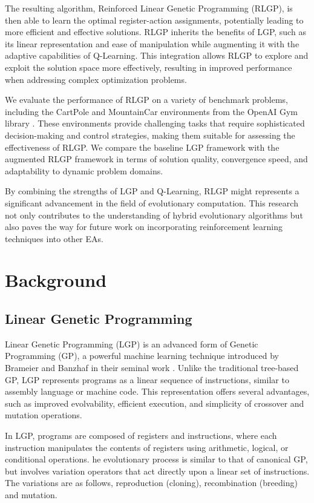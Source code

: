 \documentclass[12pt, final]{dalcsthesis}
\begin{document}
The resulting algorithm, Reinforced Linear Genetic Programming (RLGP), is then able to learn the optimal register-action assignments, potentially leading to more efficient and effective solutions. RLGP inherits the benefits of LGP, such as its linear representation and ease of manipulation while augmenting it with the adaptive capabilities of Q-Learning. This integration allows RLGP to explore and exploit the solution space more effectively, resulting in improved performance when addressing complex optimization problems.

We evaluate the performance of RLGP on a variety of benchmark problems, including the CartPole and MountainCar environments from the OpenAI Gym library \cite{1606.01540}. These environments provide challenging tasks that require sophisticated decision-making and control strategies, making them suitable for assessing the effectiveness of RLGP. We compare the baseline LGP framework with the augmented RLGP framework in terms of solution quality, convergence speed, and adaptability to dynamic problem domains.

By combining the strengths of LGP and Q-Learning, RLGP might represents a significant advancement in the field of evolutionary computation. This research not only contributes to the understanding of hybrid evolutionary algorithms but also paves the way for future work on incorporating reinforcement learning techniques into other EAs.

\chapter{Background}
\section{Linear Genetic Programming}
Linear Genetic Programming (LGP) is an advanced form of Genetic Programming (GP), a powerful machine learning technique introduced by Brameier and Banzhaf in their seminal work \cite{brameier2001comparison}. Unlike the traditional tree-based GP, LGP represents programs as a linear sequence of instructions, similar to assembly language or machine code. This representation offers several advantages, such as improved evolvability, efficient execution, and simplicity of crossover and mutation operations.

In LGP, programs are composed of registers and instructions, where each instruction manipulates the contents of registers using arithmetic, logical, or conditional operations. he evolutionary process is similar to that of canonical GP, but involves variation operators that act directly upon a linear set of instructions. The variations are as follows, reproduction (cloning), recombination (breeding) and mutation.
\end{document}

